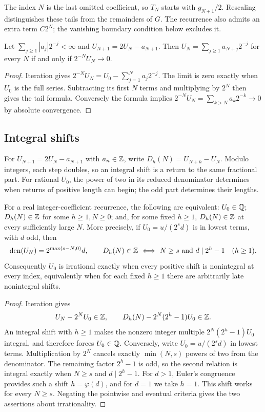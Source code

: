 \documentclass[11pt]{article}
\begin{document}
The index $N$ is the last omitted coefficient, so $T_N$ starts with
$g_{N+1}/2$.  Rescaling distinguishes these tails from the remainders
of $G$.  The recurrence also admits an extra term $C2^N$; the
vanishing boundary condition below excludes it.
\begin{lemma}\label{res:true-tail}
Let $\sum_{j\ge1}|a_j|2^{-j}<\infty$ and $U_{N+1}=2U_N-a_{N+1}$.
Then $U_N=\sum_{j\ge1}a_{N+j}2^{-j}$ for every $N$ if and only if
$2^{-N}U_N\to0$.
\end{lemma}
\begin{proof}
Iteration gives $2^{-N}U_N=U_0-\sum_{j=1}^Na_j2^{-j}$.
The limit is zero exactly when $U_0$ is the full series.  Subtracting its
first $N$ terms and multiplying by $2^N$ then gives the tail formula.
Conversely the formula implies
$2^{-N}U_N=\sum_{k>N}a_k2^{-k}\to0$ by absolute convergence.
\end{proof}

\subsection{Integral shifts}\label{sec:tail}
For $U_{N+1}=2U_N-a_{N+1}$ with $a_n\in\mathbb{Z}$, write
$D_h(N)=U_{N+h}-U_N$.  Modulo integers, each step doubles, so an
integral shift is a return to the same fractional part.
For rational $U_0$, the power of two in its reduced denominator
determines when returns of positive length can begin; the odd part
determines their lengths.

\begin{theorem}\label{res:escape-irrational}
For a real integer-coefficient recurrence, the following are equivalent:
$U_0\in\mathbb{Q}$; $D_h(N)\in\mathbb{Z}$ for some $h\ge1,N\ge0$; and, for some fixed
$h\ge1$, $D_h(N)\in\mathbb{Z}$ at every sufficiently large $N$.
More precisely, if $U_0=u/(2^sd)$ is in lowest terms, with $d$ odd, then
\[
 \operatorname{den}(U_N)=2^{\max(s-N,0)}d,\qquad
 D_h(N)\in\mathbb{Z}\ \Longleftrightarrow\ N\ge s\ \text{and}\ d\mid2^h-1
 \quad(h\ge1).
\]
Consequently $U_0$ is irrational exactly when every positive shift is
nonintegral at every index, equivalently when for each fixed $h\ge1$
there are arbitrarily late nonintegral shifts.
\end{theorem}
\begin{proof}
Iteration gives
\[
 U_N-2^NU_0\in\mathbb{Z},\qquad
 D_h(N)-2^N(2^h-1)U_0\in\mathbb{Z}.
\]
An integral shift with $h\ge1$ makes the nonzero integer multiple
$2^N(2^h-1)U_0$ integral, and therefore forces $U_0\in\mathbb{Q}$.
Conversely, write $U_0=u/(2^sd)$ in lowest terms.  Multiplication by
$2^N$ cancels exactly $\min(N,s)$ powers of two from the denominator.
The remaining factor $2^h-1$ is odd, so the second relation is integral
exactly when $N\ge s$ and $d\mid2^h-1$.  For $d>1$, Euler's congruence
provides such a shift $h=\varphi(d)$, and for $d=1$ we take $h=1$.
This shift works for every $N\ge s$.  Negating the pointwise and eventual
criteria gives the two assertions about irrationality.
\end{proof}
\end{document}
